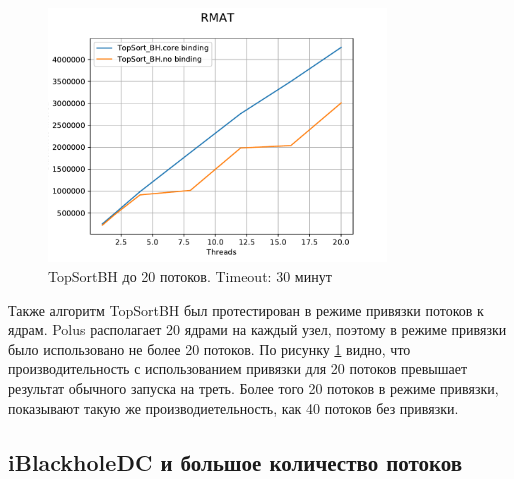 \documentclass[12pt,a4paper,oneside,openany]{article}
\theoremstyle{definition}
\theoremstyle{lemma}
\theoremstyle{remark}
\begin{document}
\begin{figure}[H]
    \centering
    \includegraphics[width=0.8\textwidth]{images/18_threads_RMAT.pdf}
    \caption{TopSortBH до 20 потоков. Timeout: 30 минут}
    \label{fig:corebinding}
\end{figure}

Также алгоритм TopSortBH был протестирован в режиме привязки потоков к ядрам.
Polus располагает 20 ядрами на каждый узел, поэтому в режиме привязки было использовано не более 20 потоков.
По рисунку \ref{fig:corebinding} видно, что производительность с использованием
привязки для 20 потоков превышает результат обычного запуска на треть.
Более того 20 потоков в режиме привязки, показывают такую же производиетельность, как 40 потоков
без привязки.

\subsection{iBlackholeDC и большое количество потоков}\label{subsec:chinesemanythreads}
\end{document}
